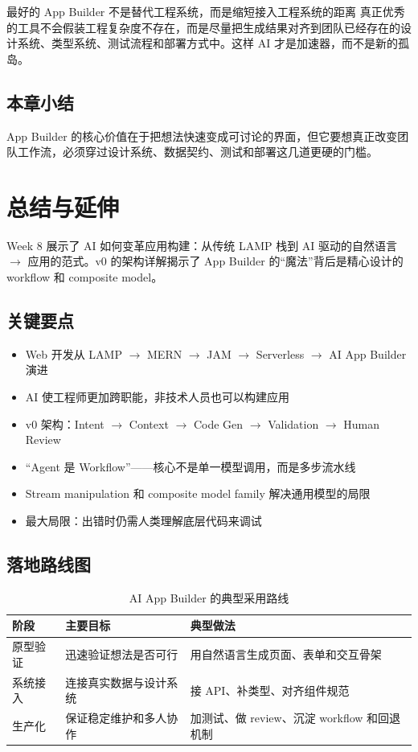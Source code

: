 \documentclass[a4paper]{article}
\begin{document}
\begin{knowledgebox}{最好的 App Builder 不是替代工程系统，而是缩短接入工程系统的距离}
真正优秀的工具不会假装工程复杂度不存在，而是尽量把生成结果对齐到团队已经存在的设计系统、类型系统、测试流程和部署方式中。这样 AI 才是加速器，而不是新的孤岛。
\end{knowledgebox}

\subsection{本章小结}

App Builder 的核心价值在于把想法快速变成可讨论的界面，但它要想真正改变团队工作流，必须穿过设计系统、数据契约、测试和部署这几道更硬的门槛。

\section{总结与延伸}

Week 8 展示了 AI 如何变革应用构建：从传统 LAMP 栈到 AI 驱动的自然语言 $\rightarrow$ 应用的范式。v0 的架构详解揭示了 App Builder 的``魔法''背后是精心设计的 workflow 和 composite model。

\subsection{关键要点}

\begin{itemize}
    \item Web 开发从 LAMP $\rightarrow$ MERN $\rightarrow$ JAM $\rightarrow$ Serverless $\rightarrow$ AI App Builder 演进
    \item AI 使工程师更加跨职能，非技术人员也可以构建应用
    \item v0 架构：Intent $\rightarrow$ Context $\rightarrow$ Code Gen $\rightarrow$ Validation $\rightarrow$ Human Review
    \item ``Agent 是 Workflow''——核心不是单一模型调用，而是多步流水线
    \item Stream manipulation 和 composite model family 解决通用模型的局限
    \item 最大局限：出错时仍需人类理解底层代码来调试
\end{itemize}

\subsection{落地路线图}

\begin{table}[H]
\centering
\begin{tabular}{p{} p{} p{}}
\toprule
阶段 & 主要目标 & 典型做法 \\
\midrule
原型验证 & 迅速验证想法是否可行 & 用自然语言生成页面、表单和交互骨架 \\
系统接入 & 连接真实数据与设计系统 & 接 API、补类型、对齐组件规范 \\
生产化 & 保证稳定维护和多人协作 & 加测试、做 review、沉淀 workflow 和回退机制 \\
\bottomrule
\end{tabular}
\caption{AI App Builder 的典型采用路线}
\end{table}
\end{document}
